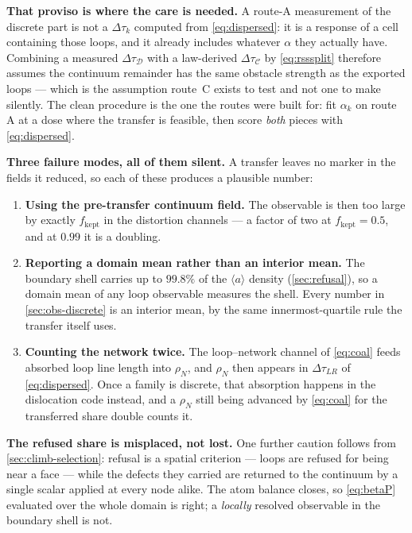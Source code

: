 \documentclass{article}
\newcommand{\aloop}{\ensuremath{\langle a\rangle}}
\begin{document}
\textbf{That proviso is where the care is needed.} A route-A measurement of the
discrete part is not a $\Delta\tau_k$ computed from \cref{eq:dispersed}: it is a
response of a cell containing those loops, and it already includes whatever
$\alpha$ they actually have. Combining a measured $\Delta\tau_{\mathcal D}$ with a
law-derived $\Delta\tau_{\mathcal C}$ by \cref{eq:rsssplit} therefore assumes the
continuum remainder has the same obstacle strength as the exported loops --- which
is the assumption route~C exists to test and not one to make silently. The clean
procedure is the one the routes were built for: fit $\alpha_k$ on route A at a
dose where the transfer is feasible, then score \emph{both} pieces with
\cref{eq:dispersed}.

\textbf{Three failure modes, all of them silent.} A transfer leaves no marker in
the fields it reduced, so each of these produces a plausible number:

\begin{enumerate}
\item \textbf{Using the pre-transfer continuum field.} The observable is then too
      large by exactly $f_{\mathrm{kept}}$ in the distortion channels --- a factor
      of two at $f_{\mathrm{kept}}=0.5$, and at $0.99$ it is a doubling.
\item \textbf{Reporting a domain mean rather than an interior mean.} The boundary
      shell carries up to $99.8\%$ of the \aloop{} density
      (\cref{sec:refusal}), so a domain mean of any loop observable measures the
      shell. Every number in \cref{sec:obs-discrete} is an interior mean, by the
      same innermost-quartile rule the transfer itself uses.
\item \textbf{Counting the network twice.} The loop--network channel of
      \cref{eq:coal} feeds absorbed loop line length into $\rho_N$, and
      $\rho_N$ then appears in $\Delta\tau_{LR}$ of \cref{eq:dispersed}. Once a
      family is discrete, that absorption happens in the dislocation code
      instead, and a $\rho_N$ still being advanced by \cref{eq:coal} for the
      transferred share double counts it.
\end{enumerate}

\textbf{The refused share is misplaced, not lost.} One further caution follows
from \cref{sec:climb-selection}: refusal is a spatial criterion --- loops are
refused for being near a face --- while the defects they carried are returned to
the continuum by a single scalar applied at every node alike. The atom balance
closes, so \cref{eq:betaP} evaluated over the whole domain is right; a
\emph{locally} resolved observable in the boundary shell is not.
\end{document}
